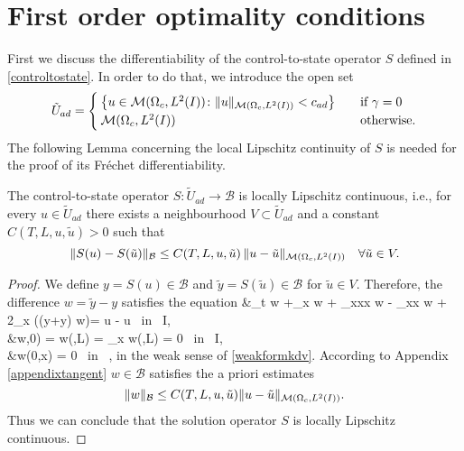 \section{First order optimality conditions}
\label{secoptconditions}
First we discuss the differentiability of the control-to-state operator $S$ defined in \eqref{controltostate}. {\color{blue}In order to do that, we introduce the open set
$$\tilde U_{ad} = \begin{cases} \left\{u \in \mathcal{M}(\Omega_c, L^{2}(I))\colon \lVert u\rVert_{\mathcal{M}(\Omega_c, L^{2}(I))}< c_{ad} \right\} &\quad\mbox{if } \gamma = 0 \\
\mathcal{M}(\Omega_c, L^{2}(I)) & \quad \mbox{otherwise.}
 \end{cases}$$}
The following Lemma concerning the local Lipschitz continuity of $S$ is needed for the proof of its Fr\'echet differentiability.
\begin{lemma}
The control-to-state operator $S\colon \tilde U_{ad}\rightarrow \mathcal B$ is locally Lipschitz continuous, i.e., for every $u\in \tilde U_{ad}$ there exists a neighbourhood $V\subset \tilde U_{ad}$ and a constant
$C(T,L,u,\tilde u)>0$ such that
\[\|S(u)-S(\tilde u)\|_{\mathcal B}\leq C(T,L,u,\tilde u)\,\|u-\tilde u\|_{\mathcal{M}(\Omega_c, L^{2}(I))}\quad \forall \tilde u\in V.\]
 \label{lipschitzcontinuity}
\end{lemma}
\begin{proof}
We define $y = S(u) \in \mathcal{B}$ and $\tilde{y} = S(\tilde u) \in \mathcal{B}$ for $\tilde u\in V$. Therefore, the difference $w = \tilde{y} - y$ satisfies the equation
\bean
&\partial_t w +\partial_x w + \partial_{xxx} w - \gamma \partial_{xx} w  +  2\partial_x ((y+\tilde y) w)= \tilde u - u \mbox{ in } I\times\Omega,\\
&w\cdot,0) = w(\cdot,L) = \partial_x w(\cdot,L) = 0 \mbox{ in } I,\\
&w(0,x) = 0 \mbox{ in } \Omega,
\eean
in the weak sense of \eqref{weakformkdv}. According to Appendix \ref{appendixtangent} $w \in \mathcal{B}$ satisfies the a priori estimates
\[
\lVert w\rVert_{\mathcal{B}} \leq C(T,L,u,\tilde u)\lVert u-\tilde u\rVert_{\mathcal{M}(\Omega_c, L^{2}(I))}.
\]
Thus we can conclude that the solution operator $S$ is locally Lipschitz continuous.
\qquad\end{proof}


